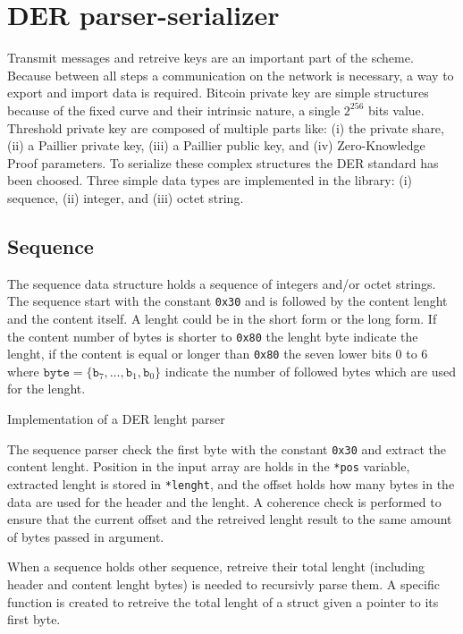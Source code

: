 \section{DER parser-serializer}

Transmit messages and retreive keys are an important part of the scheme. Because
between all steps a communication on the network is necessary, a way to export and
import data is required. Bitcoin private key are simple structures because of the
fixed curve and their intrinsic nature, a single $2^{256}$ bits value. Threshold
private key are composed of multiple parts like: (i) the private share, (ii) a
Paillier private key, (iii) a Paillier public key, and (iv) Zero-Knowledge Proof
parameters. To serialize these complex structures the DER standard has been choosed.
Three simple data types are implemented in the library: (i) sequence, (ii) integer,
and (iii) octet string.

\subsection{Sequence}

The sequence data structure holds a sequence of integers and/or octet strings. The
sequence start with the constant \texttt{0x30} and is followed by the content lenght
and the content itself.
A lenght could be in the short form or the long form. If the content number of bytes
is shorter to \texttt{0x80} the lenght byte indicate the lenght, if the content
is equal or longer than \texttt{0x80} the seven lower bits 0 to 6 where
$\texttt{byte} = \{ \texttt{b}_7, \dots, \texttt{b}_1, \texttt{b}_0\}$
indicate the number of followed bytes which are used for the lenght.

\begin{listing}
	\caption{Implementation of a DER lenght parser}
	\label{lst:implDERLenghtParser}
\end{listing}

The sequence parser check the first byte with the constant \texttt{0x30} and
extract the content lenght. Position in the input array are holds in the \texttt{*pos}
variable, extracted lenght is stored in \texttt{*lenght}, and the offset holds
how many bytes in the data are used for the header and the lenght. A coherence
check is performed to ensure that the current offset and the retreived lenght
result to the same amount of bytes passed in argument.

When a sequence holds other sequence, retreive their total lenght (including header
and content lenght bytes) is needed to recursivly parse them. A specific function
is created to retreive the total lenght of a struct given a pointer to its first
byte.

